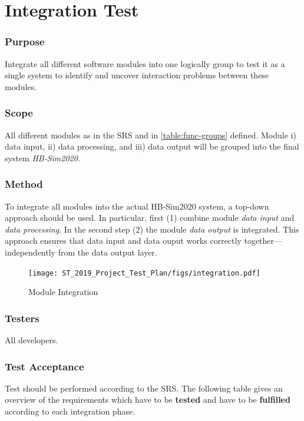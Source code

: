 \documentclass[a4paper]{article}
\begin{document}
\clearpage
\section{Integration Test}
\subsubsection*{Purpose}
Integrate all different software modules into one logically group to test it as a single system to identify and uncover interaction problems between these modules.

\subsubsection*{Scope}
All different modules as in the SRS and in \ref{table:func-groups} defined. Module i) data input, ii) data processing, and iii) data output will be grouped into the final system \textit{HB-Sim2020}.

\subsubsection*{Method}
To integrate all modules into the actual HB-Sim2020 system, a top-down approach should be used. In particular, first (1) combine module \textit{data input} and \textit{data processing}. In the second step (2) the module \textit{data output} is integrated. This approach ensures that data input and data ouput works correctly together---independently from the data output layer.

\begin{figure}[H]
\centering
    \texttt{[image: ST\_2019\_Project\_Test\_Plan/figs/integration.pdf]}
    \caption{Module Integration}
    \label{fig:integration}
\end{figure}


\subsubsection*{Testers}
All developers.

\subsubsection*{Test Acceptance}
Test should be performed according to the SRS. The following table gives an overview of the requirements which have to be \textbf{tested} and have to be \textbf{fulfilled} according to each integration phase.
\end{document}

